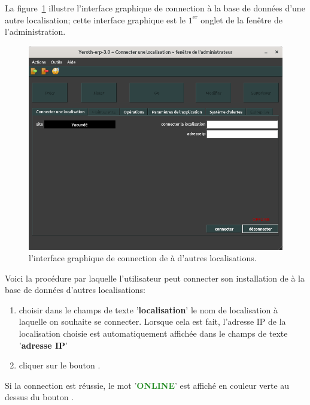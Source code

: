 
La figure~\ref{fig:yeren-admin-connection-autres-db}
illustre l'interface graphique de connection \`a la
base de donn\'ees d'une autre localisation;
cette interface graphique est le $1^{\text{er}}$ onglet
de la fen\^etre de l'administration.

\begin{figure}[!htpb]
	\centering
	\includegraphics[scale=0.45]{images/yeren-admin-connection-autres-db.png}
	\caption{l'interface graphique de connection de
		\yeroth \`a d'autres localisations.}\label{fig:yeren-admin-connection-autres-db}
\end{figure}

Voici la proc\'edure par laquelle l'utilisateur peut
connecter son installation de \yeroth \`a la base de donn\'ees
d'autres localisations:
\begin{enumerate}[1)]
	\item choisir dans le champs de texte '\textbf{localisation}'
		le nom de localisation \`a laquelle on souhaite
		se connecter. Lorsque cela est fait, l'adresse IP
		de la localisation choisie est automatiquement
		affich\'ee dans le champs de texte '\textbf{adresse IP}'
	
	\item cliquer sur le bouton .
\end{enumerate}

Si la connection est r\'eussie, le mot 
'\textbf{\textcolor{forestgreen}{ONLINE}}' est affich\'e en
couleur verte au dessus du bouton .

